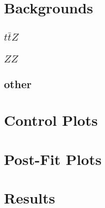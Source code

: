  
\section{Backgrounds}
\subsection{$t\bar{t}Z$}
\subsection{$ZZ$}
\subsection{other}
\section{Control Plots}
\section{Post-Fit Plots}
\section{Results}